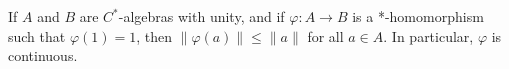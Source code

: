 If $A$ and $B$ are $C^*$-algebras with unity, and if $\varphi: A \to B$ is a *-homomorphism such that $\varphi(1) = 1$, then $\|\varphi(a)\| \leq \|a\|$ for all $a \in A$. In particular, $\varphi$ is continuous.
